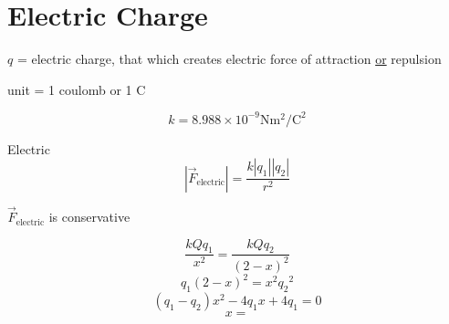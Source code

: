 \documentclass[fleqn]{article}
\begin{document}
\setlength{\mathindent}{0pt}
\section*{Electric Charge}
$q$ = electric charge, that which creates electric force of attraction \underline{or} repulsion

unit = 1 coulomb or 1 C

\[ k = 8.988 \times 10^{-9} \text{N}  \text{m}^2/\text{C}^2   \]

Electric
\[ |\vec{F}_{\text{electric} } | = \frac{k|q_1||q_2|}{r^2} \]

$\vec{F}_ \text{electric}$ is conservative

\[ \frac{kQq_1}{x^2} = \frac{kQq_2}{(2-x)^2} \]
\[ q_1(2-x)^2=x^2{q_2}^2 \]
\[ (q_1-q_2)x^2 - 4q_1x + 4q_1 = 0 \]
\[ x =  \]
\end{document}
